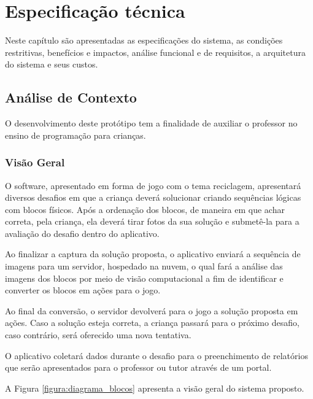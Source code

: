 \chapter{Especificação técnica} \label{cap:especificacao_tecnica}
Neste capítulo são apresentadas as especificações do sistema, as condições restritivas, benefícios e impactos, análise funcional e de requisitos, a arquitetura do sistema e seus custos.

\section{Análise de Contexto}

    O desenvolvimento deste protótipo tem a finalidade de auxiliar o professor no ensino de programação para crianças.
    
    \subsection{Visão Geral}
    
    O software, apresentado em forma de jogo com o tema reciclagem, apresentará diversos desafios em que a criança deverá solucionar criando sequências lógicas com blocos físicos. Após a ordenação dos blocos, de maneira em que achar correta, pela criança, ela deverá tirar fotos da sua solução e submetê-la para a avaliação do desafio dentro do aplicativo.
    
    Ao finalizar a captura da solução proposta, o aplicativo enviará a sequência de imagens para um servidor, hospedado na nuvem, o qual fará a análise das imagens dos blocos por meio de visão computacional a fim de identificar e converter os blocos em ações para o jogo.
    
    Ao final da conversão, o servidor devolverá para o jogo a solução proposta em ações.
    Caso a solução esteja correta, a criança passará para o próximo desafio, caso contrário, será oferecido uma nova tentativa.
    
    O aplicativo coletará dados durante o desafio para o preenchimento de relatórios que serão apresentados para o professor ou tutor através de um portal.
    
    A Figura \ref{figura:diagrama_blocos} apresenta a visão geral do sistema proposto.
  
